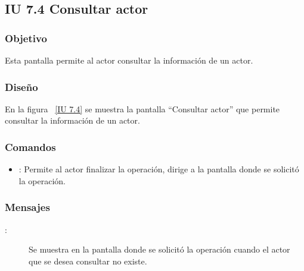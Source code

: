\newpage 
\subsection{IU 7.4 Consultar actor}

\subsubsection{Objetivo}
	
	Esta pantalla permite al actor consultar la información de un actor.

\subsubsection{Diseño}

    En la figura ~\ref{IU 7.4} se muestra la pantalla ``Consultar actor'' que permite consultar la información de un actor. \\



\subsubsection{Comandos}
\begin{itemize}
	\item {}: Permite al actor finalizar la operación, dirige a la pantalla donde se solicitó la operación.
\end{itemize}

\subsubsection{Mensajes}
	
\begin{description}
	\item[:] Se muestra en la pantalla donde se solicitó la operación cuando el actor que se desea consultar no existe.
\end{description}
